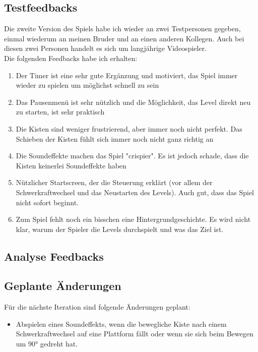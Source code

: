 \documentclass{article}
\begin{document}
\subsection{Testfeedbacks}

Die zweite Version des Spiels habe ich wieder an zwei Testpersonen gegeben, einmal wiederum an meinen Bruder und an einen anderen Kollegen.
Auch bei diesen zwei Personen handelt es sich um langjährige Videospieler.
\\
Die folgenden Feedbacks habe ich erhalten:

\begin{enumerate}
    \item Der Timer ist eine sehr gute Ergänzung und motiviert, das Spiel immer wieder zu spielen um möglichst schnell zu sein
    \item Das Pausenmenü ist sehr nützlich und die Möglichkeit, das Level direkt neu zu starten, ist sehr praktisch
    \item Die Kisten sind weniger frustrierend, aber immer noch nicht perfekt. Das Schieben der Kisten fühlt sich immer noch nicht ganz richtig an
    \item Die Soundeffekte machen das Spiel "crispier". Es ist jedoch schade, dass die Kisten keinerlei Soundeffekte haben
    \item Nützlicher Startscreen, der die Steuerung erklärt (vor allem der Schwerkraftwechsel und das Neustarten des Levels). Auch gut, dass das Spiel nicht sofort beginnt.
    \item Zum Spiel fehlt noch ein bisschen eine Hintergrundgeschichte. Es wird nicht klar, warum der Spieler die Levels durchspielt und was das Ziel ist.
\end{enumerate}

\subsection{Analyse Feedbacks}

\subsection{Geplante Änderungen}

Für die nächste Iteration sind folgende Änderungen geplant:

\begin{itemize}
    \item Abspielen eines Soundeffekts, wenn die bewegliche Kiste nach einem Schwerkraftwechsel auf eine Plattform fällt oder wenn sie sich beim Bewegen um 90° gedreht hat.
\end{itemize}
\end{document}

